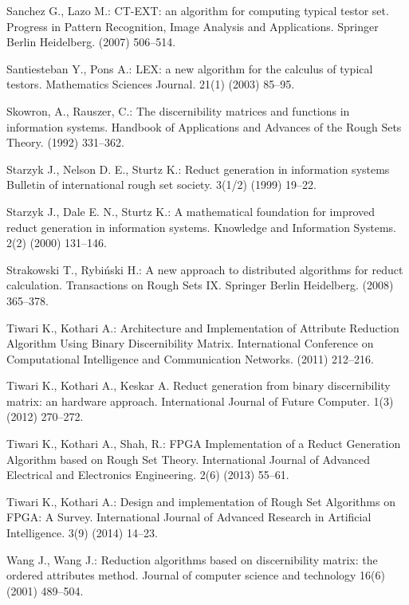 \documentclass[11pt]{article}   %
\begin{document}
\begin{thebibliography}{}
 	Sanchez G., Lazo M.:
 	CT-EXT: an algorithm for computing typical testor set.
 	Progress in Pattern Recognition, Image Analysis and Applications. 
 	Springer Berlin Heidelberg. (2007) 506--514.
 
	Santiesteban Y., Pons A.:
	LEX: a new algorithm for the calculus of typical testors.
	Mathematics Sciences Journal. 21(1) (2003) 85--95.
	
	Skowron, A., Rauszer, C.:
	The discernibility matrices and functions in information systems. 
	Handbook of Applications and Advances of the Rough Sets Theory. (1992) 331--362.

	Starzyk J., Nelson D. E., Sturtz K.:
	Reduct generation in information systems
	Bulletin of international rough set society. 3(1/2) (1999) 19--22.

	Starzyk J., Dale E. N., Sturtz K.:
	A mathematical foundation for improved reduct generation in information systems.
	Knowledge and Information Systems. 2(2) (2000) 131--146.

	Strakowski T.,  Rybi\'nski H.:
	A new approach to distributed algorithms for reduct calculation.
	Transactions on Rough Sets IX. Springer Berlin Heidelberg. (2008) 365--378.

	Tiwari K., Kothari A.:
	Architecture and Implementation of Attribute Reduction Algorithm Using Binary Discernibility Matrix.
	International Conference on Computational Intelligence and Communication Networks. (2011) 212--216.

	Tiwari K., Kothari A., Keskar A.  
	Reduct generation from binary discernibility matrix: an hardware approach. 
	International Journal of Future Computer. 1(3) (2012) 270--272.

	Tiwari K., Kothari A., Shah, R.:
	FPGA Implementation of a Reduct Generation Algorithm based on Rough Set Theory. 
	International Journal of Advanced Electrical and Electronics Engineering. 2(6) (2013) 55--61.

	Tiwari K., Kothari A.:
	Design and implementation of Rough Set Algorithms on FPGA: A Survey.
	International Journal of Advanced Research in Artificial Intelligence. 3(9) (2014) 14--23.
		
	Wang J., Wang J.:
	Reduction algorithms based on discernibility matrix: the ordered attributes method.
	Journal of computer science and technology 16(6) (2001) 489--504.


\end{thebibliography}
\end{document}
